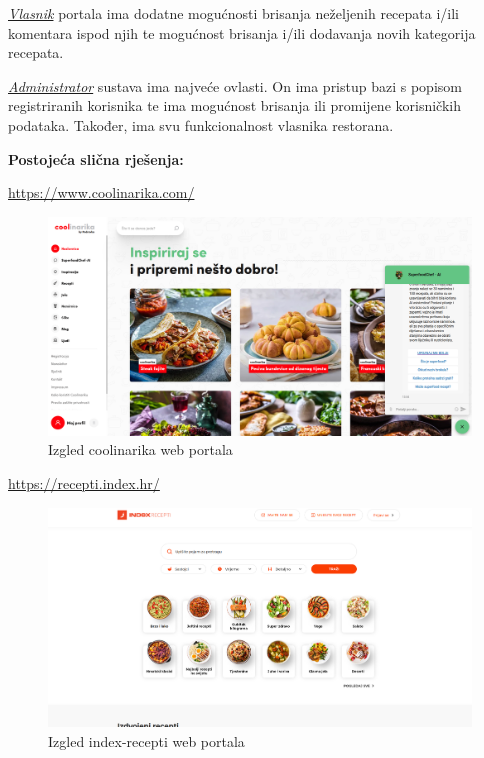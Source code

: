 		\underline{\textit{Vlasnik}} portala ima dodatne mogućnosti brisanja neželjenih recepata i/ili komentara ispod njih
		te mogućnost brisanja i/ili dodavanja novih kategorija recepata.

		\underline{\textit{Administrator}} sustava ima najveće ovlasti. On ima pristup bazi s popisom registriranih korisnika
		te ima mogućnost brisanja ili promijene korisničkih podataka. Također, ima svu funkcionalnost vlasnika restorana.
		
		\bigskip

		\textbf{Postojeća slična rješenja:}

		\url{https://www.coolinarika.com/}

		\begin{figure}[H]
			\includegraphics[scale=0.2]{slike/coolinarika.png}
			\centering
			\caption{Izgled coolinarika web portala}
			\label{fig:coolinarika}
		\end{figure}

		\url{https://recepti.index.hr/}

		\begin{figure}[H]
			\includegraphics[scale=0.2]{slike/index-recepti.png} 
			\centering
			\caption{Izgled index-recepti web portala}
			\label{fig:coolinarika}
		\end{figure}

